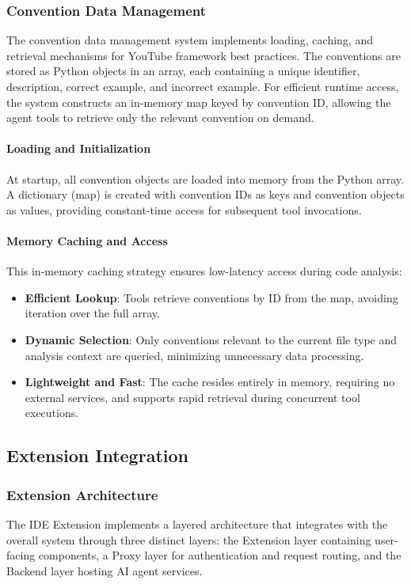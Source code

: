 \begin{spacing}{1.2}
\subsubsection{Convention Data Management}
The convention data management system implements loading, caching, and retrieval mechanisms for YouTube framework best practices. The conventions are stored as Python objects in an array, each containing a unique identifier, description, correct example, and incorrect example. For efficient runtime access, the system constructs an in-memory map keyed by convention ID, allowing the agent tools to retrieve only the relevant convention on demand. 

\paragraph{Loading and Initialization}
At startup, all convention objects are loaded into memory from the Python array. A dictionary (map) is created with convention IDs as keys and convention objects as values, providing constant-time access for subsequent tool invocations.

\paragraph{Memory Caching and Access}
This in-memory caching strategy ensures low-latency access during code analysis:

\begin{itemize}
    \item \textbf{Efficient Lookup}: Tools retrieve conventions by ID from the map, avoiding iteration over the full array.
    \item \textbf{Dynamic Selection}: Only conventions relevant to the current file type and analysis context are queried, minimizing unnecessary data processing.
    \item \textbf{Lightweight and Fast}: The cache resides entirely in memory, requiring no external services, and supports rapid retrieval during concurrent tool executions.
\end{itemize}


\subsection{Extension Integration}

\subsubsection{Extension Architecture}
The IDE Extension implements a layered architecture that integrates with the overall system through three distinct layers: the Extension layer containing user-facing components, a Proxy layer for authentication and request routing, and the Backend layer hosting AI agent services.


\end{spacing}
